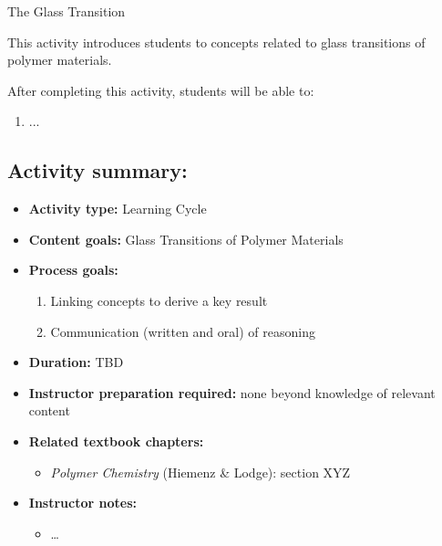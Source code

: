 %
%
%
%

\renewcommand{\figpath}{content/polymphys/thermal-transitions/Tg/figs}
\renewcommand{\labelbase}{Tg}

\begin{activity}{The Glass Transition}

\begin{instructornotes}
	This activity introduces students to concepts related to glass transitions of polymer materials.
	
	After completing this activity, students will be able to:
	\begin{enumerate}
		\item ...
	\end{enumerate}
	
	\subsection*{Activity summary:}
	\begin{itemize}
		\item \textbf{Activity type:} Learning Cycle
		\item \textbf{Content goals:} Glass Transitions of Polymer Materials
		\item \textbf{Process goals:} %
			\begin{enumerate}
				\item Linking concepts to derive a key result
				\item Communication (written and oral) of reasoning
			\end{enumerate}
		\item \textbf{Duration:} TBD
		\item \textbf{Instructor preparation required:} none beyond knowledge of relevant content
		\item \textbf{Related textbook chapters:}
			\begin{itemize}
				\item \emph{Polymer Chemistry} (Hiemenz \& Lodge): section XYZ
			\end{itemize}
		\item \textbf{Instructor notes:}
			\begin{itemize}
				\item \dots
			\end{itemize}
	\end{itemize}
	

\end{instructornotes}
\end{activity}
